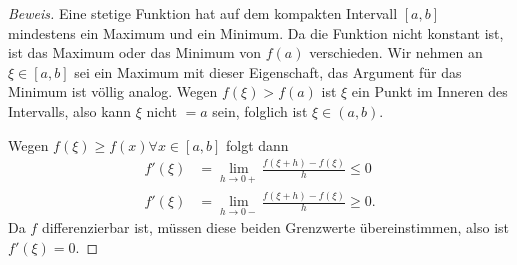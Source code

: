 \begin{proof}[Beweis]
Eine stetige Funktion hat auf dem kompakten Intervall $[a,b]$ mindestens
ein Maximum und ein Minimum.
Da die Funktion nicht konstant ist, ist das Maximum oder das Minimum
von $f(a)$ verschieden.
Wir nehmen an $\xi\in[a,b]$ sei ein Maximum mit dieser Eigenschaft,
das Argument für das Minimum ist völlig analog.
Wegen $f(\xi)>f(a)$ ist $\xi$ ein Punkt im Inneren des Intervalls,
also kann $\xi$ nicht $=a$ sein, folglich ist $\xi\in(a,b)$.

Wegen $f(\xi) \ge f(x)\forall x\in[a,b]$
folgt dann
\begin{align*}
f'(\xi) &= \lim_{h\to 0+}  \frac{f(\xi+h)-f(\xi)}{h} \le 0
\\
f'(\xi) &= \lim_{h\to 0-}  \frac{f(\xi+h)-f(\xi)}{h} \ge 0.
\end{align*}
Da $f$ differenzierbar ist, müssen diese beiden Grenzwerte übereinstimmen,
also ist $f'(\xi)=0$.
\end{proof}


